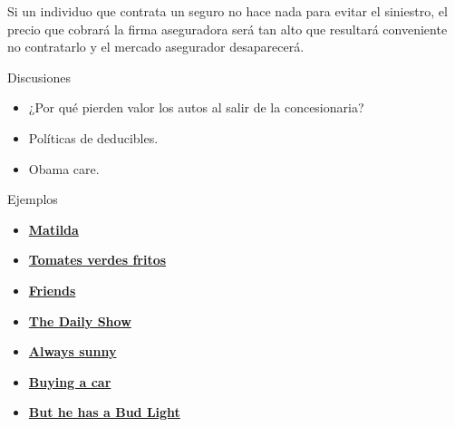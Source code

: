 \documentclass{beamer}
\begin{document}
\begin{frame}
    \begin{boxA}
        \centering
        Si un individuo que contrata un seguro no hace nada para evitar el
        siniestro, el precio que cobrará la firma aseguradora será tan alto
        que resultará conveniente no contratarlo y el mercado asegurador
        desaparecerá.
    \end{boxA}
\end{frame}

\begin{frame}{Discusiones}
    \begin{itemize}
        \item ¿Por qué pierden valor los autos al salir de la concesionaria?
        \item Políticas de deducibles.
        \item Obama care.
    \end{itemize}
\end{frame}

\begin{frame}{Ejemplos}
    \begin{itemize}
    \item \href{https://www.youtube.com/watch?v=qlg0qakJhKU}{\textbf{Matilda}}
    \item \href{https://www.youtube.com/watch?v=akA8co61He4}{\textbf{Tomates verdes fritos}}
    \item \href{https://www.youtube.com/watch?v=X8BPfLhH6MA}{\textbf{Friends}}
    \item \href{https://videos.criticalcommons.org/media/encoded/16/jtierney86/43ba1b1ac3e94df3974f987cc912ae_Hxgbfl1.mp4}{\textbf{The Daily Show}}
    \item \href{http://videos.criticalcommons.org/transcoded/http/www.criticalcommons.org/Members/JJWooten/clips/always-sunny-paying-for-care/video_file/mp4-high/always-sunny-cost-of-care-mp4.mp4}{\textbf{Always sunny}}
    \item \href{https://www.youtube.com/watch?v=SrPu-xGrKrk}{\textbf{Buying a car}}
    \item \href{https://www.youtube.com/watch?v=ZZq0ShjEd-E}{\textbf{But he has a Bud Light}}
    \end{itemize}
\end{frame}
\end{document}
